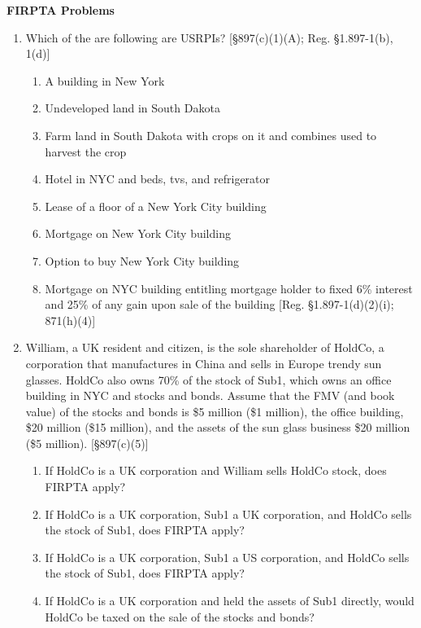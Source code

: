 	\begin{center}
		\textbf{FIRPTA Problems}
	\end{center}
	\begin{select}
	
	\begin{enumerate}
	
	\item Which of the are following are USRPIs? [\S 897(c)(1)(A); Reg. \S 1.897-1(b), 1(d)]
			\begin{enumerate}
				\item A building in New York
				\item Undeveloped land in South Dakota
				\item Farm land in South Dakota with crops on it and combines used to harvest the crop
				\item Hotel in NYC and beds, tvs, and refrigerator
				\item Lease of a floor of a New York City building
				\item Mortgage on New York City building
				\item Option to buy New York City building
				\item Mortgage on NYC building entitling mortgage holder to fixed 6\% interest and 25\% of any gain upon sale of the building [Reg. \S 1.897-1(d)(2)(i); 871(h)(4)]
			\end{enumerate}
		\item William, a UK resident and citizen, is the sole shareholder of HoldCo, a corporation that manufactures in China and sells in Europe trendy sun glasses.  HoldCo also owns 70\% of the  stock of Sub1, which owns an office building in NYC and stocks and bonds.  Assume that the FMV (and book value) of the stocks and bonds is \$5 million (\$1 million), the office building, \$20 million (\$15 million), and the assets of the sun glass business \$20 million (\$5 million). [\S 897(c)(5)]
					\begin{enumerate}
						\item  If HoldCo is a UK corporation and William sells HoldCo stock, does FIRPTA apply?
						\item  If HoldCo is a UK corporation, Sub1 a UK corporation, and HoldCo sells the stock of Sub1, does FIRPTA apply?
									\item If HoldCo is a UK corporation, Sub1 a US corporation, and HoldCo sells the stock of Sub1, does FIRPTA apply?
									\item If HoldCo is a UK corporation and held the assets of Sub1 directly, would HoldCo be taxed on the sale of the stocks and bonds?

\end{enumerate}
\end{enumerate}
\end{select}
